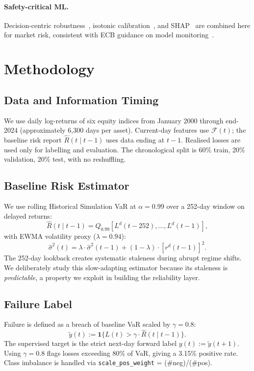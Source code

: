 \documentclass[sigconf, anonymous]{acmart}
\begin{document}
\paragraph{Safety-critical ML.}
Decision-centric robustness~\cite{chow2022decision}, isotonic
calibration~\cite{zadrozny2002transforming}, and
SHAP~\cite{lundberg2017unified} are combined here for market risk,
consistent with ECB guidance on model monitoring~\cite{ecb2024guide}.

\section{Methodology}
\label{sec:method}

\subsection{Data and Information Timing}
We use daily log-returns of six equity indices from January 2000 through end-2024 (approximately 6,300 days per asset). Current-day features use $\mathcal{F}(t)$; the baseline risk report $\hat{R}(t \mid t - 1)$ uses data ending at $t-1$. Realised losses are used only for labelling and evaluation. The chronological split is 60\% train, 20\% validation, 20\% test, with no reshuffling.

\subsection{Baseline Risk Estimator}
We use rolling Historical Simulation VaR at $\alpha = 0.99$ over a 252-day window on delayed returns:
\begin{equation}
\hat{R}(t \mid t - 1) = Q_{0.99} [L^d(t - 252), \dots, L^d(t - 1)],
\end{equation}
with EWMA volatility proxy ($\lambda = 0.94$):
\begin{equation}
\hat{\sigma}^2(t) = \lambda \cdot \hat{\sigma}^2(t - 1) + (1 - \lambda) \cdot [r^d(t - 1)]^2.
\end{equation}
The 252-day lookback creates systematic staleness during abrupt regime shifts. We deliberately study this slow-adapting estimator because its staleness is \textit{predictable}, a property we exploit in building the reliability layer.

\subsection{Failure Label}
Failure is defined as a breach of baseline VaR scaled by $\gamma = 0.8$:
\begin{equation}
\tilde{y}(t) := \mathbf{1} \{ L(t) > \gamma \cdot \hat{R}(t \mid t - 1) \}.
\end{equation}
The supervised target is the strict next-day forward label $y(t) := \tilde{y}(t + 1)$. Using $\gamma = 0.8$ flags losses exceeding 80\% of VaR, giving a 3.15\% positive rate. Class imbalance is handled via \texttt{scale\_pos\_weight} = (\#neg)/(\#pos).
\end{document}
